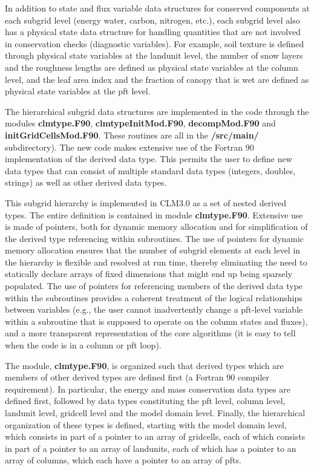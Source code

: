 In addition to state and flux variable data structures for conserved
components at each subgrid level (energy water, carbon, nitrogen,
etc.), each subgrid level also has a physical state data structure for
handling quantities that are not involved in conservation checks
(diagnostic variables).  For example, soil texture is defined through
physical state variables at the landunit level, the number of snow
layers and the roughness lengths are defined as physical state
variables at the column level, and the leaf area index and the
fraction of canopy that is wet are defined as physical state variables
at the pft level.

The hierarchical subgrid data structures are implemented in the code
through the modules {\bf clmtype.F90}, {\bf clmtypeInitMod.F90}, {\bf
decompMod.F90} and {\bf initGridCellsMod.F90}. These routines are all
in the {\bf /src/main/} subdirectory). The new code makes extensive use
of the Fortran 90 implementation of the derived data type.  This
permits the user to define new data types that can consist of multiple
standard data types (integers, doubles, strings) as well as other
derived data types.

This subgrid hierarchy is implemented in CLM3.0 as a set of nested
derived types.  The entire definition is contained in module {\bf
clmtype.F90}. Extensive use is made of pointers, both for dynamic
memory allocation and for simplification of the derived type
referencing within subroutines.  The use of pointers for dynamic
memory allocation ensures that the number of subgrid elements at each
level in the hierarchy is flexible and resolved at run time, thereby
eliminating the need to statically declare arrays of fixed dimensions
that might end up being sparsely populated.  The use of pointers for
referencing members of the derived data type within the subroutines
provides a coherent treatment of the logical relationships between
variables (e.g., the user cannot inadvertently change a pft-level
variable within a subroutine that is supposed to operate on the column
states and fluxes), and a more transparent representation of the core
algorithms (it is easy to tell when the code is in a column or pft
loop).

The module, {\bf clmtype.F90}, is organized such that derived types
which are members of other derived types are defined first (a Fortran
90 compiler requirement).  In particular, the energy and mass
conservation data types are defined first, followed by data types
constituting the pft level, column level, landunit level, gridcell
level and the model domain level. Finally, the hierarchical
organization of these types is defined, starting with the model domain
level, which consists in part of a pointer to an array of gridcells,
each of which consists in part of a pointer to an array of landunits,
each of which has a pointer to an array of columns, which each have a
pointer to an array of pfts.  

